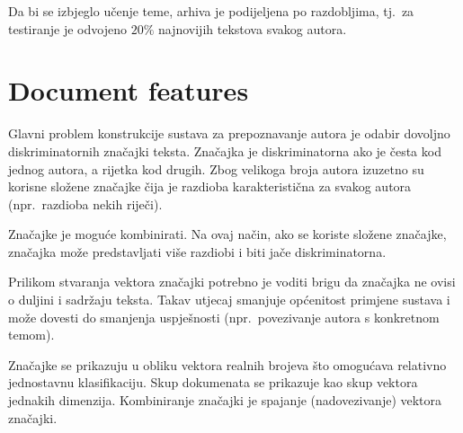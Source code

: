 \documentclass[11pt,english]{article}
\begin{document}
\begin{multicols}{2}
Da bi se izbjeglo učenje teme, arhiva je podijeljena po razdobljima, tj.~za
testiranje je odvojeno $20\%$ najnovijih tekstova svakog autora.

\begin{minipage}{0.8\linewidth}
\vspace{10pt}
\centerline{\resizebox{1.4\linewidth}{!}{}}%
%
\label{fig:articlesPerAuthor}
\end{minipage}

\begin{minipage}{0.8\linewidth}
\vspace{10pt}
\centerline{\resizebox{1.4\linewidth}{!}{}}%
%
\label{fig:wordsPerAuthor}
\end{minipage}

\begin{minipage}{0.8\linewidth}
\vspace{10pt}
\centerline{\resizebox{1.4\linewidth}{!}{}}%
%
\label{fig:avgWordsPerAuthorArticle}
\end{minipage}

\section{Document features}
Glavni problem konstrukcije sustava za prepoznavanje autora je odabir dovoljno
diskriminatornih značajki teksta. Značajka je diskriminatorna ako je česta kod
jednog autora, a rijetka kod drugih. Zbog velikoga broja autora izuzetno su
korisne složene značajke čija je razdioba karakteristična za svakog autora
(npr.~razdioba nekih riječi).

Značajke je moguće kombinirati. Na ovaj način, ako se koriste složene značajke,
značajka može predstavljati više razdiobi i biti jače diskriminatorna.

Prilikom stvaranja vektora značajki potrebno je voditi brigu da značajka ne
ovisi o duljini i sadržaju teksta. Takav utjecaj smanjuje općenitost primjene
sustava i može dovesti do smanjenja uspješnosti (npr.~povezivanje autora s
konkretnom temom).

Značajke se prikazuju u obliku vektora realnih brojeva što omogućava relativno
jednostavnu klasifikaciju. Skup dokumenata se prikazuje kao skup vektora jednakih
dimenzija. Kombiniranje značajki je spajanje (nadovezivanje) vektora značajki.


\end{multicols}
\end{document}
